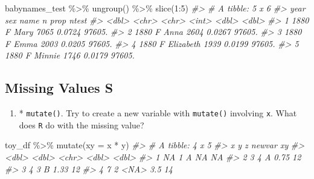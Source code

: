\documentclass[
]{book}
\newenvironment{Shaded}{\begin{snugshade}}{\end{snugshade}}
\newcommand{\AttributeTok}[1]{\textcolor[rgb]{0.77,0.63,0.00}{#1}}
\newcommand{\CommentTok}[1]{\textcolor[rgb]{0.56,0.35,0.01}{\textit{#1}}}
\newcommand{\DecValTok}[1]{\textcolor[rgb]{0.00,0.00,0.81}{#1}}
\newcommand{\FunctionTok}[1]{\textcolor[rgb]{0.00,0.00,0.00}{#1}}
\newcommand{\NormalTok}[1]{#1}
\newcommand{\SpecialCharTok}[1]{\textcolor[rgb]{0.00,0.00,0.00}{#1}}
\providecommand{\tightlist}{%
  \setlength{\itemsep}{0pt}\setlength{\parskip}{0pt}}
\begin{document}
\begin{Shaded}
\begin{Highlighting}[]
\NormalTok{babynames\_test }\SpecialCharTok{\%\textgreater{}\%} \FunctionTok{ungroup}\NormalTok{() }\SpecialCharTok{\%\textgreater{}\%} \FunctionTok{slice}\NormalTok{(}\DecValTok{1}\SpecialCharTok{:}\DecValTok{5}\NormalTok{)}
\CommentTok{\#\textgreater{} \# A tibble: 5 x 6}
\CommentTok{\#\textgreater{}    year sex   name          n   prop  ntest}
\CommentTok{\#\textgreater{}   \textless{}dbl\textgreater{} \textless{}chr\textgreater{} \textless{}chr\textgreater{}     \textless{}int\textgreater{}  \textless{}dbl\textgreater{}  \textless{}dbl\textgreater{}}
\CommentTok{\#\textgreater{} 1  1880 F     Mary       7065 0.0724 97605.}
\CommentTok{\#\textgreater{} 2  1880 F     Anna       2604 0.0267 97605.}
\CommentTok{\#\textgreater{} 3  1880 F     Emma       2003 0.0205 97605.}
\CommentTok{\#\textgreater{} 4  1880 F     Elizabeth  1939 0.0199 97605.}
\CommentTok{\#\textgreater{} 5  1880 F     Minnie     1746 0.0179 97605.}
\end{Highlighting}
\end{Shaded}

\hypertarget{missing-values-s}{%
\subsection{Missing Values S}\label{missing-values-s}}

\begin{enumerate}
\def\labelenumi{\arabic{enumi}.}
\tightlist
\item
  * \texttt{mutate()}. Try to create a new variable with \texttt{mutate()} involving \texttt{x}. What does \texttt{R} do with the missing value?
\end{enumerate}

\begin{Shaded}
\begin{Highlighting}[]
\NormalTok{toy\_df }\SpecialCharTok{\%\textgreater{}\%} \FunctionTok{mutate}\NormalTok{(}\AttributeTok{xy =}\NormalTok{ x }\SpecialCharTok{*}\NormalTok{ y)}
\CommentTok{\#\textgreater{} \# A tibble: 4 x 5}
\CommentTok{\#\textgreater{}       x     y z     newvar    xy}
\CommentTok{\#\textgreater{}   \textless{}dbl\textgreater{} \textless{}dbl\textgreater{} \textless{}chr\textgreater{}  \textless{}dbl\textgreater{} \textless{}dbl\textgreater{}}
\CommentTok{\#\textgreater{} 1    NA     1 A      NA       NA}
\CommentTok{\#\textgreater{} 2     3     4 A       0.75    12}
\CommentTok{\#\textgreater{} 3     4     3 B       1.33    12}
\CommentTok{\#\textgreater{} 4     7     2 \textless{}NA\textgreater{}    3.5     14}
\end{Highlighting}
\end{Shaded}
\end{document}
